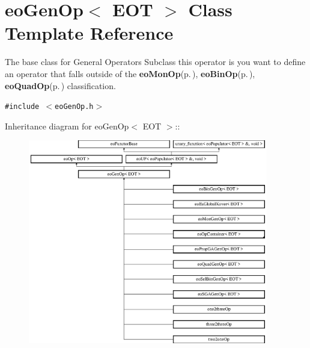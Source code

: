 \section{eo\-Gen\-Op$<$ EOT $>$ Class Template Reference}
\label{classeo_gen_op}
The base class for General Operators Subclass this operator is you want to define an operator that falls outside of the {\bf eo\-Mon\-Op}{\rm (p.\,\pageref{classeo_mon_op})}, {\bf eo\-Bin\-Op}{\rm (p.\,\pageref{classeo_bin_op})}, {\bf eo\-Quad\-Op}{\rm (p.\,\pageref{classeo_quad_op})} classification.  


{\tt \#include $<$eo\-Gen\-Op.h$>$}

Inheritance diagram for eo\-Gen\-Op$<$ EOT $>$::\begin{figure}[H]
\begin{center}
\leavevmode
\includegraphics[height=8.91923cm]{classeo_gen_op}
\end{center}
\end{figure}
